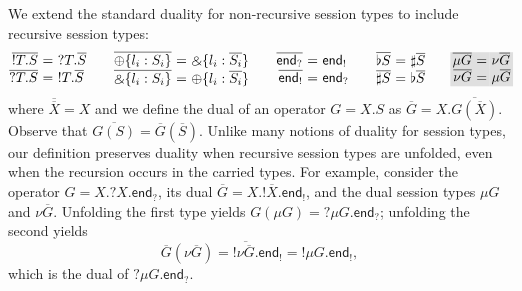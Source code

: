 \documentclass[orivec,envcountsame]{llncs}
\makeatletter
\newcommand{\with}{\mathbin\binampersand}
\newcommand{\gvdual}[1]{\overline{#1}}
\newcommand{\gvout}[2]{{!#1.#2}}
\newcommand{\gvin}[2]{{?#1.#2}}
\newcommand{\outterm}{\mkwd{end}_!}
\newcommand{\interm}{\mkwd{end}_?}
\newcommand{\gvserver}[1]{\flat #1}
\newcommand{\gvservice}[1]{\sharp #1}
\newcommand{\mkwd}[1]{\mathsf{#1}}
\newcommand{\ba}{\begin{array}}
\newcommand{\ea}{\end{array}}
\newenvironment{eqs}{\ba{@{}r@{~}c@{~}l@{}}}{\ea}
\newcommand\shaderow{\noalign{\vskip-0.4pt}\rowcolor{shade}[0.6mm]}
\makeatother
\begin{document}
We extend the standard duality for non-recursive session types to include recursive session types:
\small\[
\ba{@{}c@{\qquad}c@{\qquad}c@{\qquad}c@{\qquad}c@{}}
\begin{eqs}
\gvdual{\gvout{T}{S}} &=& \gvin{T}{\gvdual{S}} \\
\gvdual{\gvin{T}{S}} &=& \gvout{T}{\gvdual{S}} \\
\end{eqs}
&
\begin{eqs}
  \gvdual{\oplus \{ l_i: S_i \}} &=& \with \{ l_i : \gvdual{S_i} \} \\
  \gvdual{\with \{ l_i: S_i \}} &=& \oplus \{ l_i : \gvdual{S_i} \} \\
\end{eqs}
&
\begin{eqs}
  \gvdual{\interm} &=& \outterm \\
  \gvdual{\outterm} &=& \interm \\
\end{eqs}
&
\begin{eqs}
  \gvdual{\gvserver{S}} &=& \gvservice{\gvdual{S}} \\
  \gvdual{\gvservice{S}} &=& \gvserver{\gvdual{S}} \\
\end{eqs}
&
\begin{eqs}
  \shaderow \gvdual{\mu G} &=& \nu \gvdual{G} \\
  \shaderow \gvdual{\nu G} &=& \mu \gvdual{G}
\end{eqs}
\ea
\]\normalsize
where $\gvdual{\gvdual{X}} = X$ and we define the dual of an operator $G = X.S$ as $\gvdual{G} =
X.\gvdual{G(\gvdual{X})}.$ Observe that $\gvdual{G(S)} = \gvdual{G}(\gvdual{S})$.  Unlike many
notions of duality for session types, our definition preserves duality when recursive session types
are unfolded, even when the recursion occurs in the carried types.  For example, consider the
operator $G = X.\gvin{X}{\interm}$, its dual $\gvdual{G} = X.\gvout{\gvdual{X}}{\outterm}$, and the
dual session types $\mu G$ and $\nu \gvdual{G}$.  Unfolding the first type yields $G(\mu G) =
\gvin{\mu G}{\interm}$; unfolding the second yields
\small\[
  \gvdual{G}(\nu \gvdual{G}) = \gvout{\gvdual{\nu \gvdual{G}}}{\outterm} = \gvout{\mu G}{\outterm},
\]\normalsize
which is the dual of $\gvin{\mu G}{\interm}$.
\end{document}
